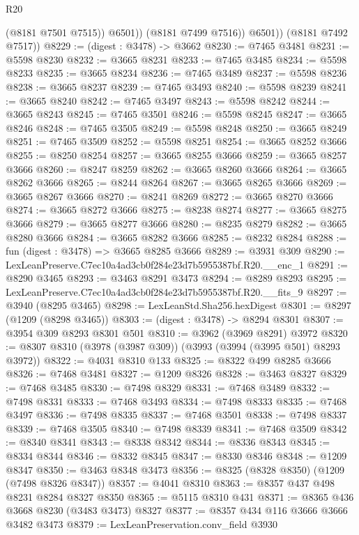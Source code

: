 \begin{lexlean}{R20}
\begin{coremodule}
                  (@8181 @7501 @7515))
                @6501))
            (@8181 @7499 @7516))
          @6501))
      (@8181 @7492 @7517))
@8229 := (digest : @3478) -> @3662
@8230 := @7465 @3481
@8231 := @5598 @8230
@8232 := @3665 @8231
@8233 := @7465 @3485
@8234 := @5598 @8233
@8235 := @3665 @8234
@8236 := @7465 @3489
@8237 := @5598 @8236
@8238 := @3665 @8237
@8239 := @7465 @3493
@8240 := @5598 @8239
@8241 := @3665 @8240
@8242 := @7465 @3497
@8243 := @5598 @8242
@8244 := @3665 @8243
@8245 := @7465 @3501
@8246 := @5598 @8245
@8247 := @3665 @8246
@8248 := @7465 @3505
@8249 := @5598 @8248
@8250 := @3665 @8249
@8251 := @7465 @3509
@8252 := @5598 @8251
@8254 := @3665 @8252 @3666
@8255 := @8250 @8254
@8257 := @3665 @8255 @3666
@8259 := @3665 @8257 @3666
@8260 := @8247 @8259
@8262 := @3665 @8260 @3666
@8264 := @3665 @8262 @3666
@8265 := @8244 @8264
@8267 := @3665 @8265 @3666
@8269 := @3665 @8267 @3666
@8270 := @8241 @8269
@8272 := @3665 @8270 @3666
@8274 := @3665 @8272 @3666
@8275 := @8238 @8274
@8277 := @3665 @8275 @3666
@8279 := @3665 @8277 @3666
@8280 := @8235 @8279
@8282 := @3665 @8280 @3666
@8284 := @3665 @8282 @3666
@8285 := @8232 @8284
@8288 := fun (digest : @3478) => @3665 @8285 @3666
@8289 := @3931 @309
@8290 := LexLeanPreserve.C7ec10a4ad3cb0f284e23d7b5955387bf.R20.__enc_1
@8291 := @8290 @3465
@8293 := @3463 @8291 @3473
@8294 := @8289 @8293
@8295 := LexLeanPreserve.C7ec10a4ad3cb0f284e23d7b5955387bf.R20.__fits_9
@8297 := @3940 (@8295 @3465)
@8298 := LexLeanStd.Sha256.hexDigest
@8301 := @8297 (@1209 (@8298 @3465))
@8303 := (digest : @3478) -> @8294 @8301
@8307 := @3954 @309 @8293 @8301 @501
@8310 := @3962 (@3969 @8291) @3972
@8320 := @8307 @8310 (@3978 (@3987 @309)) (@3993 (@3994 (@3995 @501) @8293 @3972))
@8322 := @4031 @8310 @133
@8325 := @8322 @499 @8285 @3666
@8326 := @7468 @3481
@8327 := @1209 @8326
@8328 := @3463 @8327
@8329 := @7468 @3485
@8330 := @7498 @8329
@8331 := @7468 @3489
@8332 := @7498 @8331
@8333 := @7468 @3493
@8334 := @7498 @8333
@8335 := @7468 @3497
@8336 := @7498 @8335
@8337 := @7468 @3501
@8338 := @7498 @8337
@8339 := @7468 @3505
@8340 := @7498 @8339
@8341 := @7468 @3509
@8342 := @8340 @8341
@8343 := @8338 @8342
@8344 := @8336 @8343
@8345 := @8334 @8344
@8346 := @8332 @8345
@8347 := @8330 @8346
@8348 := @1209 @8347
@8350 := @3463 @8348 @3473
@8356 := @8325 (@8328 @8350) (@1209 (@7498 @8326 @8347))
@8357 := @4041 @8310
@8363 := @8357 @437 @498 @8231 @8284 @8327 @8350
@8365 := @5115 @8310 @431
@8371 := @8365 @436 @3668 @8230 (@3483 @3473) @8327
@8377 := @8357 @434 @116 @3666 @3666 @3482 @3473
@8379 := LexLeanPreservation.conv_field @3930

\end{coremodule}
\end{lexlean}
